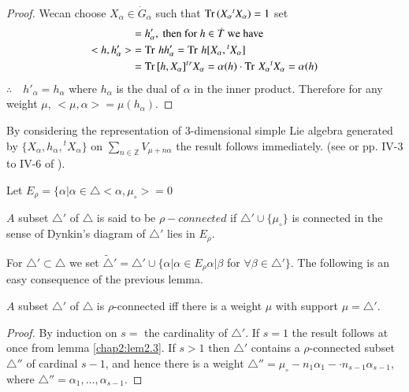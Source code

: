 \begin{proof}
  We\pageoriginale can choose $X_\alpha \in \dot{G}_\alpha$ such that $\operatorname{Tr\,} (X_\alpha
  {}^tX_\alpha)=1$ set
  \begin{align*}
    [X_\alpha, {}^tX_\alpha] & = h'_\alpha, ~\text{then for $h \in
      \dot{T}$ we have}\\
    <h, h'_\alpha> & = \Tr hh'_\alpha= \Tr h[X_\alpha, {}^tX_\alpha]\\
    & = \Tr [h, X_\alpha]^t {}^rX_\alpha = \alpha (h) \cdot \Tr X_\alpha
    {}^t X_\alpha = \alpha (h)
  \end{align*}
$\therefore \quad h'_\alpha = h_\alpha$ where $h_\alpha$ is the dual
of $\alpha$ in the inner product. Therefore for any weight $\mu$,
$<\mu, \alpha>= \mu (h_\alpha)$.
\end{proof}

By considering the representation of 3-dimensional simple Lie algebra
generated by $\{ X_\alpha, h_\alpha, {}^tX_\alpha\}$ on
$\displaystyle{\sum_{n \in \mathbb{Z}}} V_{\mu + n \alpha}$ the result
follows immediately. (see \cite{10} or pp. IV-3 to IV-6 of
\cite{23}). 

\begin{defi*}
  Let $E_\rho= \{ \alpha \big| \alpha \in \triangle < \alpha ,
  \mu_\circ > =0$
\end{defi*}

$A$ subset $\triangle'$ of $\triangle$ is said to be $\rho-connected$
if $\triangle' \cup \{ \mu_\circ\}$ is connected in the sense of
Dynkin's diagram of $\triangle'$ lies in $E_\rho$.

For $\triangle' \subset \triangle$ we set $\widetilde{\triangle}'=
\triangle' \cup \{ \alpha \big| \alpha \in E_\rho \alpha \big|
\beta$ for $\forall \beta \in \triangle'\}$. The following is an easy
consequence of the previous lemma.

\begin{lemma} \label{chap2:lem2.4}
  $A$ subset $\triangle'$ of $\triangle$ is $\rho$-connected iff there
  is a weight $\mu$ with support $\mu = \triangle'$.
\end{lemma}

\begin{proof}
  By induction on $s=$ the cardinality of $\triangle'$. If $s=1$ the
  result follows at once from lemma \ref{chap2:lem2.3}. If $s>1$ then
  $\triangle'$ contains a $\rho$-connected subset $\triangle''$ of
  cardinal $s-1$, and hence there is a weight $\triangle'' = \mu_\circ - n_1
  \alpha_1 - \cdot n_{s-1} \alpha_{s-1}$, where $\triangle''= \alpha_1,
  \ldots , \alpha_{s-1}$.
\end{proof}

